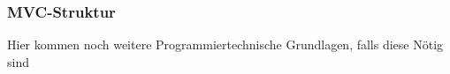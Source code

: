 \subsubsection{MVC-Struktur}\label{subsec:mvc}

Hier kommen noch weitere Programmiertechnische Grundlagen, falls diese Nötig sind


